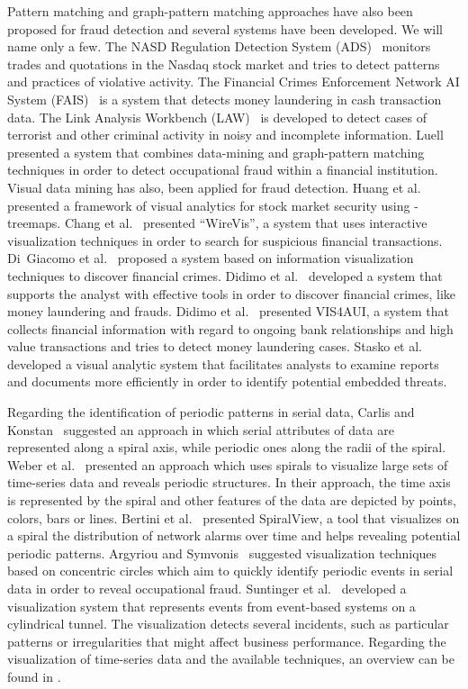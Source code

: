 \documentclass[conference]{IEEEtran}
\begin{document}
Pattern matching and graph-pattern matching approaches have also
been proposed for fraud detection and several systems have been
developed. We will name only a few. The NASD Regulation Detection
System (ADS)~\cite{KSH*S98, Sen00, SGS*02} monitors trades and
quotations in the Nasdaq stock market and tries to detect patterns
and practices of violative activity. The Financial Crimes
Enforcement Network AI System (FAIS)~\cite{GS95, SGW*95} is a system
that detects money laundering in cash transaction data. The Link
Analysis Workbench (LAW)~\cite{WBH*03} is developed to detect cases
of terrorist and other criminal activity in noisy and incomplete
information. Luell~\cite{Lue10} presented a system that combines
data-mining and graph-pattern matching techniques in order to detect
occupational fraud within a financial institution. Visual data
mining has also, been applied for fraud detection. Huang et
al.~\cite{HLN09} presented a framework of visual analytics for stock
market security using -treemaps. Chang et al.~\cite{CLG*08}
presented ``WireVis'', a system that uses interactive visualization
techniques in order to search for suspicious financial transactions.
Di~Giacomo et al.~\cite{GDLP10} proposed a system based on
information visualization techniques to discover financial crimes.
Didimo et al.~\cite{DLMP11} developed a system that supports the
analyst with effective tools in order to discover financial crimes,
like money laundering and frauds. Didimo et al.~\cite{DLM12}
presented VIS4AUI, a system that collects financial information with
regard to ongoing bank relationships and high value transactions and
tries to detect money laundering cases. Stasko et al.~\cite{SGL08}
developed a visual analytic system that facilitates analysts to
examine reports and documents more efficiently in order to identify
potential embedded threats.

Regarding the identification of periodic patterns in serial data,
Carlis and Konstan~\cite{CK98} suggested an approach in which serial
attributes of data are represented along a spiral axis, while
periodic ones along the radii of the spiral. Weber et
al.~\cite{WMM01} presented an approach which uses spirals to
visualize large sets of time-series data and reveals periodic
structures. In their approach, the time axis is represented by the
spiral and other features of the data are depicted by points,
colors, bars or lines. Bertini et al.~\cite{BHL07} presented
SpiralView, a tool that visualizes on a spiral the distribution of
network alarms over time and helps revealing potential periodic
patterns. Argyriou and Symvonis~\cite{AS12} suggested visualization
techniques based on concentric circles which aim to quickly identify
periodic events in serial data in order to reveal occupational
fraud. Suntinger et al.~\cite{SOSG08} developed a visualization
system that represents events from event-based systems on a
cylindrical tunnel. The visualization detects several incidents,
such as particular patterns or irregularities that might affect
business performance. Regarding the visualization of time-series
data and the available techniques, an overview can be found in
\cite{ABMTS07, MS03, SC00}.
\end{document}
